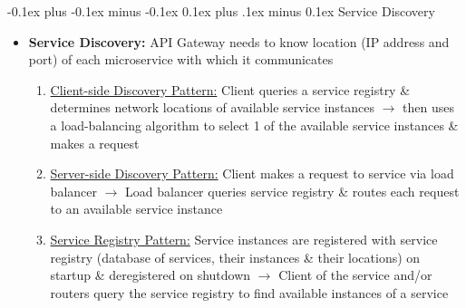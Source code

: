 \documentclass[landscape]{article}
\makeatletter
\renewcommand{\subsection}{\@startsection{subsection}{2}{0mm}%
  {-0.1ex plus -0.1ex minus -0.1ex}%
  {0.1ex plus .1ex minus 0.1ex}%
{\normalfont\scriptsize\bfseries}}
\makeatother
\begin{document}
\begin{multicols*}{5}
    \subsection{Service Discovery}
    \begin{itemize}
      \item \textbf{Service Discovery:} API Gateway needs to know location (IP address and port) of each microservice with which it communicates
      \begin{enumerate}
        \item \underline{Client-side Discovery Pattern:} Client queries a service registry \& determines network locations of available service instances $\rightarrow$ then uses a load-balancing algorithm to select 1 of the available service instances \& makes a request
        \item \underline{Server-side Discovery Pattern:} Client makes a request to service via load balancer $\rightarrow$ Load balancer queries service registry \& routes each request to an available service instance
        \item \underline{Service Registry Pattern:} Service instances are registered with service registry (database of services, their instances \& their locations) on startup \& deregistered on shutdown $\rightarrow$ Client of the service and/or routers query the service registry to find available instances of a service
      \end{enumerate}
    \end{itemize}
\end{multicols*}
\end{document}
